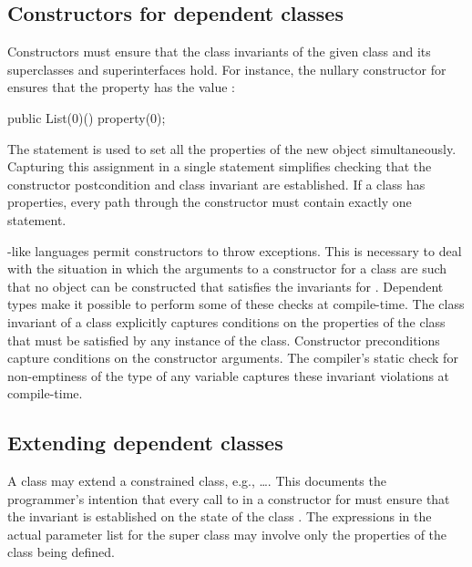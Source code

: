 \subsection{Constructors for dependent classes}


Constructors must ensure that the class invariants of the given
class and its superclasses and superinterfaces hold.
For instance, the
nullary constructor for  ensures that the property
 has the value :
\begin{displayxten}
    public List(0)() { property(0); }
\end{displayxten}
The  statement is used to set all the properties
of the new object simultaneously.  Capturing this assignment in
a single statement simplifies checking that the constructor
postcondition and class invariant are established.  If a class
has properties, every path through the constructor must contain
exactly one  statement.

\java{}-like languages permit constructors to throw exceptions. This
is necessary to deal with the situation in which the arguments to a
constructor for a class  are such that no object can be
constructed that satisfies the invariants for . Dependent
types make it possible to perform some of these checks at
compile-time. The class invariant of a class explicitly captures
conditions on the properties of the class that must be satisfied by
any instance of the class.  Constructor preconditions capture
conditions on the constructor arguments.
The compiler's static check for
non-emptiness of the type of any variable captures these invariant
violations at compile-time.



\subsection{Extending dependent classes}

A class may extend a constrained class, e.g.,
\dots{}.
This documents the programmer's intention that
every call to  in a constructor for  must ensure
that the invariant  is established on the state of the class
. The expressions in the actual parameter list for the super
class may involve only the properties of the class being defined.

